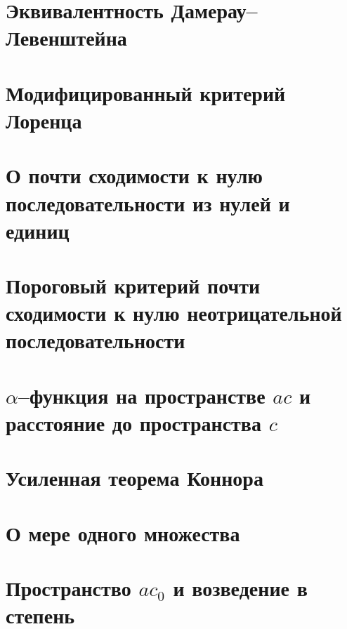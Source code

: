 \documentclass[12pt,a4paper,openbib]{report}
\theoremstyle{definition}
\begin{document}
	\section{Эквивалентность Дамерау--Левенштейна}
	

	\section{Модифицированный критерий Лоренца}
	

	\section{О почти сходимости к нулю последовательности из нулей и единиц}
	

	\section{Пороговый критерий почти сходимости к нулю неотрицательной последовательности}
	


	\section{$\alpha$--функция на пространстве $ac$ и расстояние до пространства $c$}
	

	\section{Усиленная теорема Коннора}
	

	\section{О мере одного множества}
	

	\section{Пространство $ac_0$ и возведение в степень}
	
\end{document}
